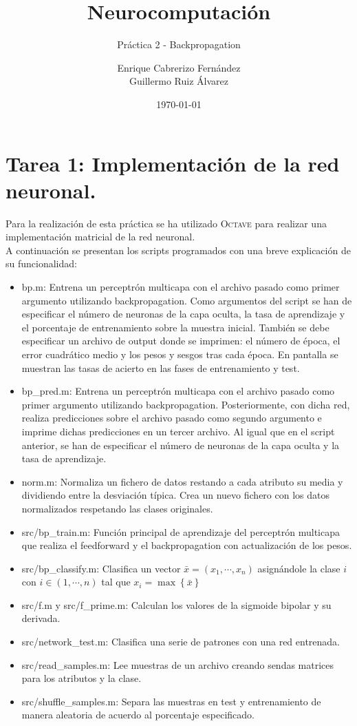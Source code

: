 \documentclass[spanish]{assignment}
\title{Neurocomputación}
\subtitle{Práctica 2 - Backpropagation}
\author{Enrique Cabrerizo Fernández\\ Guillermo Ruiz Álvarez}
\date{\today}
\begin{document}
	\makepre
	\section{Tarea 1: Implementación de la red neuronal.}
	Para la realización de esta práctica se ha utilizado \textsc{Octave} para realizar una implementación matricial de la red neuronal.\\
	A continuación se presentan los scripts programados con una breve explicación de su funcionalidad:
	\begin{itemize}
		\item bp.m: Entrena un perceptrón multicapa con el archivo pasado como primer argumento utilizando backpropagation. Como argumentos del script se han de especificar el número de neuronas de la capa oculta, la tasa de aprendizaje y el porcentaje de entrenamiento sobre la muestra inicial. También se debe especificar un archivo de output donde se imprimen: el número de época, el error cuadrático medio y los pesos y sesgos tras cada época. En pantalla se muestran las tasas de acierto en las fases de entrenamiento y test.
		\item bp\_pred.m: Entrena un perceptrón multicapa con el archivo pasado como primer argumento utilizando backpropagation. Posteriormente, con dicha red, realiza predicciones sobre el archivo pasado como segundo argumento e imprime dichas predicciones en un tercer archivo. Al igual que en el script anterior, se han de especificar el número de neuronas de la capa oculta y la tasa de aprendizaje.
		\item norm.m: Normaliza un fichero de datos restando a cada atributo su media y dividiendo entre la desviación típica. Crea un nuevo fichero con los datos normalizados respetando las clases originales.
		\item src/bp\_train.m: Función principal de aprendizaje del perceptrón multicapa que realiza el feedforward y el backpropagation con actualización de los pesos.
		\item src/bp\_classify.m: Clasifica un vector $\bar{x}=(x_1,\cdots,x_n)$ asignándole la clase $i$ con $i \in (1,\cdots,n)$ tal que $x_i = \max\left\{\bar{x}\right\}$
		\item src/f.m y src/f\_prime.m: Calculan los valores de la sigmoide bipolar y su derivada.
		\item src/network\_test.m: Clasifica una serie de patrones con una red entrenada.
		\item src/read\_samples.m: Lee muestras de un archivo creando sendas matrices para los atributos y la clase. 
		\item src/shuffle\_samples.m: Separa las muestras en test y entrenamiento de manera aleatoria de acuerdo al porcentaje especificado.
	\end{itemize}
\end{document}
